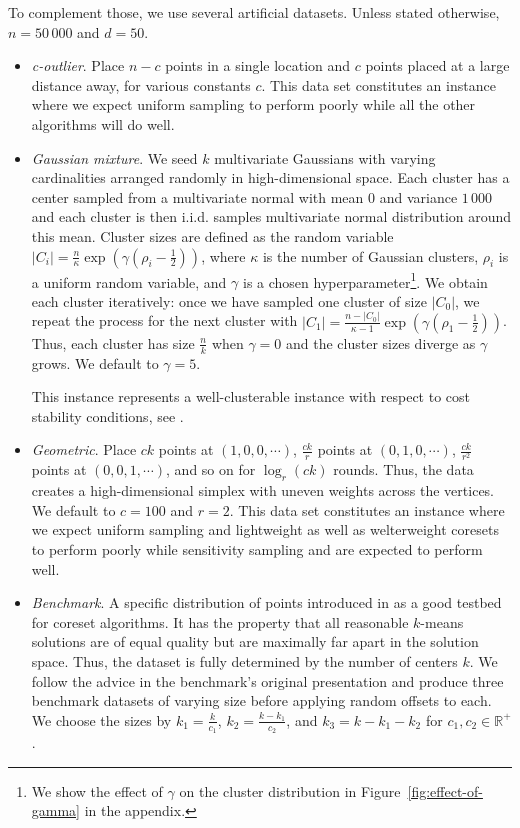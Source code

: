To complement those, we use several artificial datasets. Unless stated otherwise, $n = 50\,000$ and $d=50$.
\begin{itemize}
    \item \emph{c-outlier}. Place $n-c$ points in a single location and $c$ points placed at a large distance away, for various constants $c$. 
	This data set constitutes an instance where we expect uniform sampling to perform poorly while all the other algorithms will do well.

    \item \emph{Gaussian mixture}. We seed $k$ multivariate Gaussians with varying cardinalities arranged randomly in high-dimensional space.  Each cluster has a center sampled from a multivariate normal with mean $0$ and variance $1\,000$ and each cluster is then i.i.d. samples multivariate normal distribution around
        this mean. Cluster sizes are defined as the random variable $|C_i| = \frac{n}{\kappa} \exp \left( \gamma(\rho_i - \frac{1}{2}) \right)$, where $\kappa$
        is the number of Gaussian clusters, $\rho_i$ is a uniform random variable, and $\gamma$ is a chosen hyperparameter\footnote{We show the effect of
        $\gamma$ on the cluster distribution in Figure~\ref{fig:effect-of-gamma} in the appendix.}. We obtain each cluster iteratively: once we have sampled one cluster of size
        $|C_0|$, we repeat the process for the next cluster with $|C_1| = \frac{n - |C_0|}{\kappa-1}\exp \left( \gamma(\rho_1 - \frac{1}{2}) \right)$.  Thus,
        each cluster has size $\frac{n}{k}$ when $\gamma = 0$ and the cluster sizes diverge as $\gamma$ grows. We default to $\gamma = 5$.
        
  This instance represents a well-clusterable instance with respect to cost stability conditions, see \cite{AwS12,Cohen-AddadS17,KuK10,ORSS12}.

    \item \emph{Geometric}. Place $c k$ points at $(1, 0, 0, \cdots)$, $\frac{ck}{r}$ points at $(0, 1, 0, \cdots)$, $\frac{ck}{r^2}$ points
        at $(0, 0, 1, \cdots)$, and so on for $\log_r (ck)$ rounds. Thus, the data creates a high-dimensional simplex with uneven weights across the vertices. We
        default to $c = 100$ and $r=2$. 
	This data set constitutes an instance where we expect uniform sampling and lightweight as well as welterweight coresets to perform poorly while sensitivity sampling and \fkmeans are expected to perform well.

    \item \emph{Benchmark}. A specific distribution of points introduced in \cite{chrisESA} as a good testbed for coreset algorithms.  It has the property that
        all reasonable $k$-means solutions are of equal quality but are maximally far apart in the solution space. Thus, the dataset is fully determined by the
        number of centers $k$. We follow the advice in the benchmark's original presentation and produce three benchmark datasets of varying size before
        applying random offsets to each. We choose the sizes by $k_1 = \frac{k}{c_1}$, $k_2 = \frac{k - k_1}{c_2}$, and $k_3 = k - k_1 - k_2$ for $c_1, c_2 \in
        \mathbb{R}^+$.

\end{itemize}

